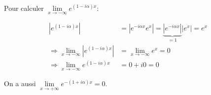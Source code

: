 \begin{remark}
    Pour calculer
    $\lim\limits_{x \rightarrow -\infty} e^{(1 - i \alpha) x}$:
    
    \begin{align*}
    \left|e^{(1 - i \alpha) x}\right|
    &= \left|e^{- i \alpha x} e^x\right|
    = \underbrace{\left|e^{- i \alpha x}\right|}_{= 1} \left|e^x\right|
    = e^x\\
    \Rightarrow \lim\limits_{x \rightarrow -\infty} \left|e^{(1 - i \alpha) x}\right|
    &= \lim\limits_{x \rightarrow -\infty} e^x
    = 0\\
    \Rightarrow \lim\limits_{x \rightarrow -\infty} e^{(1 - i \alpha) x}
    &= 0 + i0
    = 0
    \end{align*}
    
    On a aussi $\lim\limits_{x \rightarrow +\infty} e^{-(1 + i \alpha) x} = 0$.
\end{remark}


